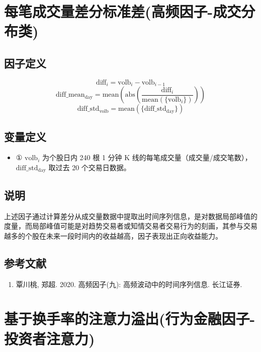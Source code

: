 \documentclass{article}
\begin{document}
\section{每笔成交量差分标准差(高频因子-成交分布类)}

\subsection{因子定义}

\begin{equation}
    \mathrm{diff}_i = \mathrm{volb}_i - \mathrm{volb}_{i-1}
\end{equation}
\begin{equation}
    \mathrm{diff\_mean_{day}} = \mathrm{mean} \left( \mathrm{abs} \left( \frac{\mathrm{diff}_i}{\mathrm{mean}(\{\mathrm{volb}_i\})} \right) \right)
\end{equation}
\begin{equation}
    \mathrm{diff\_std_{volb}} = \mathrm{mean}(\{ \mathrm{diff\_std_{day}} \})
\end{equation}

\subsection{变量定义}
\begin{itemize}
    \item ① \( \mathrm{volb}_i \) 为个股日内 240 根 1 分钟 K 线的每笔成交量（成交量/成交笔数），\( \mathrm{diff\_std_{day}} \) 取过去 20 个交易日数据。
\end{itemize}

\subsection{说明}
上述因子通过计算差分从成交量数据中提取出时间序列信息，是对数据局部峰值的度量，而局部峰值可能是对趋势交易者或知情交易者交易行为的刻画，其参与交易越多的个股在未来一段时间内的收益越高，因子表现出正向收益能力。

\subsection{参考文献}
\begin{enumerate}
    \item 覃川桃, 郑超. 2020. 高频因子(九): 高频波动中的时间序列信息. 长江证券.
\end{enumerate}

\section{基于换手率的注意力溢出(行为金融因子-投资者注意力)}
\end{document}
